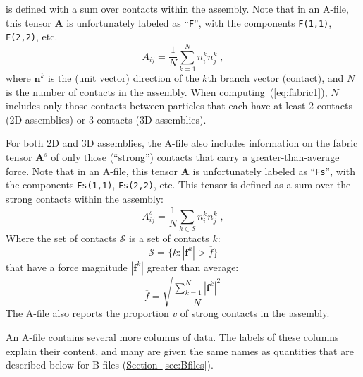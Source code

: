 \documentclass[letterpaper,11pt]{article}
\begin{document}
is defined with a sum over contacts 
within the assembly.  Note that in an A-file, this tensor
$\mathbf{A}$ is unfortunately labeled as ``\texttt{F}'', with the components
\texttt{F(1,1)}, \texttt{F(2,2)}, etc.
\begin{equation}\label{eq:fabric1}
A_{ij} = \frac{1}{N}
\sum_{k=1}^{N}
n_{i}^{k} n_{j}^{k}\;,
\end{equation}
where $\mathbf{n}^{k}$ is the (unit vector) direction of the 
$k$th branch vector (contact),
and $N$ is the number of contacts in the assembly.
When computing~(\ref{eq:fabric1}), $N$ includes only
those contacts between particles that each have at least 2 contacts
(2D assemblies) or 3 contacts (3D assemblies).
\par
For both 2D and 3D assemblies, the A-file also includes information
on the fabric tensor $\mathbf{A}^{s}$ of only those (``strong'') contacts that
carry a greater-than-average force.
Note that in an A-file, this tensor
$\mathbf{A}$ is unfortunately labeled as ``\texttt{Fs}'', with the components
\texttt{Fs(1,1)}, \texttt{Fs(2,2)}, etc.
This tensor is defined as a sum over the strong contacts within
the assembly:
\begin{equation}\label{eq:fabric2}
A_{ij}^{s} = \frac{1}{N}
\sum_{k\in \mathcal{S}}
n_{i}^{k} n_{j}^{k}\;,
\end{equation}
Where the set of contacts $\mathcal{S}$ is a set of contacts $k$:
\begin{equation}
\mathcal{S} = \{k: |\mathbf{f}^{k}| > \overline{f} \}
\end{equation}
that have a force magnitude $|\mathbf{f}^{k}|$ greater than average:
\begin{equation}
\overline{f} = \sqrt{
\frac{\sum_{k=1}^{N} |\mathbf{f}^{k}|^{2}} {N}
                    }
\end{equation}
The A-file also reports the proportion $v$ of strong contacts in the assembly.
\par
An A-file contains several more columns of data.  The labels of these
columns explain their content, and many are given the same names as
quantities that are described below for B-files
(\hyperref[sec:Bfiles]{Section~\ref*{sec:Bfiles}}).
%
\end{document}
